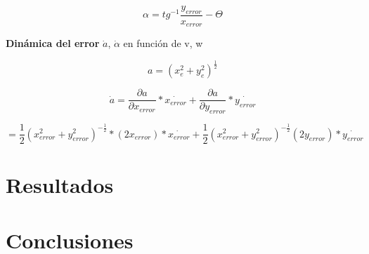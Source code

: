 \documentclass[oneside,onecolumn]{article}
\begin{document}
\[ \alpha = tg^{-1} \frac{y_{error}}{x_{error}} - \Theta\]

\textbf{Dinámica del error} $\dot{a}$, $\dot{\alpha}$ en función de v, w

\[ a = (x_{e}^{2} + y_{e}^{2})^{\frac{1}{2}}\]

\[ \dot{a} = \frac{\partial a}{\partial x_{error}}*\dot{x_{error}} + \frac{\partial a}{\partial y_{error}}*\dot{y_{error}}\]

\[ = \frac{1}{2} (x_{error}^{2} + y_{error}^{2})^{-\frac{1}{2}}*(2x_{error})*\dot{x_{error}} + \frac{1}{2} (x_{error}^{2}+y_{error}^2)^{-\frac{1}{2}}(2y_{error})*\dot{y_{error}}\]

\section{Resultados}


\section{Conclusiones}



\begin{thebibliography}{0} %

  
    
\end{thebibliography}

\end{document}
